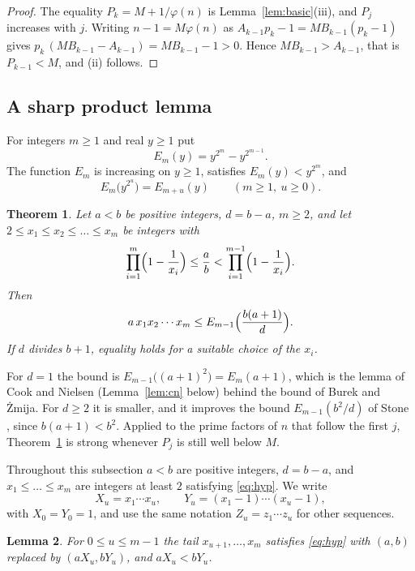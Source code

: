\documentclass[screen,reqno]{aomart}
\numberwithin{equation}{section}
\theoremstyle{plain}
\newtheorem{theorem}{Theorem}[section]
\newtheorem{lemma}[theorem]{Lemma}
\theoremstyle{definition}
\theoremstyle{remark}
\begin{document}
\begin{proof}
The equality $P_k=M+1/\varphi(n)$ is Lemma~\ref{lem:basic}(iii), and
$P_j$ increases with $j$. Writing $n-1=M\varphi(n)$ as
$A_{k-1}p_k-1=MB_{k-1}(p_k-1)$ gives
$p_k\,(MB_{k-1}-A_{k-1})=MB_{k-1}-1>0$. Hence $MB_{k-1}>A_{k-1}$, that
is $P_{k-1}<M$, and (ii) follows.
\end{proof}

\subsection{A sharp product lemma}\label{sec:product}
For integers $m\ge1$ and real $y\ge1$ put
\[
  E_m(y)=y^{2^m}-y^{2^{m-1}} .
\]
The function $E_m$ is increasing on $y\ge1$, satisfies
$E_m(y)<y^{2^m}$, and
\begin{equation}\label{eq:Ecomp}
  E_m\bigl(y^{2^u}\bigr)=E_{m+u}(y)\qquad(m\ge1,\ u\ge0).
\end{equation}

\begin{theorem}\label{thm:deficit}
Let $a<b$ be positive integers, $d=b-a$, $m\ge2$, and let
$2\le x_1\le x_2\le\dots\le x_m$ be integers with
\begin{equation}\label{eq:hyp}
  \prod_{i=1}^{m}\Bigl(1-\frac1{x_i}\Bigr)\le\frac ab
  <\prod_{i=1}^{m-1}\Bigl(1-\frac1{x_i}\Bigr).
\end{equation}
Then
\[
  a\,x_1x_2\cdots x_m\le E_{m-1}\Bigl(\frac{b(a+1)}{d}\Bigr).
\]
If $d$ divides $b+1$, equality holds for a suitable choice of the
$x_i$.
\end{theorem}

For $d=1$ the bound is $E_{m-1}\bigl((a+1)^2\bigr)=E_m(a+1)$, which is
the lemma of Cook and Nielsen (Lemma~\ref{lem:cn} below) behind the
bound of Burek and \.Zmija. For $d\ge2$ it is smaller, and it improves
the bound $E_{m-1}(b^2/d)$ of Stone \cite[Corollary~1]{Sto24}, since
$b(a+1)<b^2$. Applied to the prime factors of $n$ that follow the
first $j$, Theorem~\ref{thm:deficit} is strong whenever $P_j$ is still
well below $M$.

Throughout this subsection $a<b$ are positive integers, $d=b-a$, and
$x_1\le\dots\le x_m$ are integers at least $2$ satisfying
\eqref{eq:hyp}. We write
\[
  X_u=x_1\cdots x_u,\qquad Y_u=(x_1-1)\cdots(x_u-1),
\]
with $X_0=Y_0=1$, and use the same notation $Z_u=z_1\cdots z_u$ for
other sequences.

\begin{lemma}\label{lem:tail}
For $0\le u\le m-1$ the tail $x_{u+1},\dots,x_m$ satisfies
\eqref{eq:hyp} with $(a,b)$ replaced by $(aX_u,bY_u)$, and
$aX_u<bY_u$.
\end{lemma}
\end{document}
